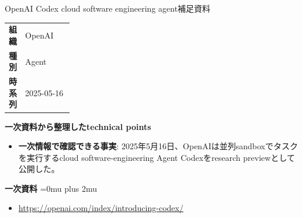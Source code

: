 \begin{technicalnote}{OpenAI Codex cloud software engineering agent}{補足資料}
\begingroup
\begin{tabularx}{\linewidth}{@{}>{\bfseries}p{0.22\linewidth}X@{}}
組織 & OpenAI \\
種別 & Agent \\
時系列 & 2025-05-16 \\
\end{tabularx}
\smallskip
\begin{minipage}{\linewidth}
{\bfseries 一次資料から整理したtechnical points}
\begin{itemize}[leftmargin=1.5em,itemsep=0.35em]
\item \textbf{一次情報で確認できる事実}: 2025年5月16日、OpenAIは並列sandboxでタスクを実行するcloud software-engineering Agent Codexをresearch previewとして公開した。
\end{itemize}
\begin{samepage}
{\bfseries 一次資料}
\begingroup\sloppy
\Urlmuskip=0mu plus 2mu\relax
\begin{itemize}[leftmargin=1.5em,itemsep=0.25em]
\item {\scriptsize\url{https://openai.com/index/introducing-codex/}}
\end{itemize}
\endgroup
\end{samepage}
\end{minipage}
\endgroup
\end{technicalnote}
\medskip

